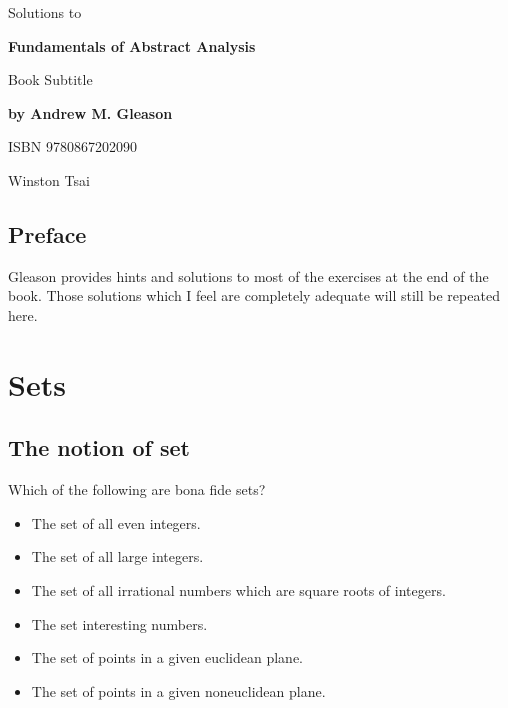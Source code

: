 \documentclass{report}
\begin{document}
\begin{titlepage}
  \begin{center}
    \vspace*{1cm}
    \LARGE
    Solutions to

    \vspace{0.5cm}

    \Huge
    \textbf{Fundamentals of Abstract Analysis}

    \huge
    Book Subtitle

    \LARGE
    \textbf{by Andrew M. Gleason}

    \vspace{0.2cm}

    \large
    ISBN 9780867202090

    \vfill

    \LARGE{Winston Tsai}
  \end{center}
\end{titlepage}
\newpage

\section*{Preface}
Gleason provides hints and solutions to most of the
exercises at the end of the book.
Those solutions which I feel are completely adequate will still be repeated here.


\newpage
\tableofcontents
\newpage

\chapter{Sets}

\section{The notion of set}

\begin{exercise}
Which of the following are bona fide sets?
\begin{itemize}
    \item The set of all even integers.
    \item The set of all large integers.
    \item The set of all irrational numbers which are square roots of integers.
    \item The set interesting numbers.
    \item The set of points in a given euclidean plane.
    \item The set of points in a given noneuclidean plane.
\end{itemize}
\end{exercise}
\end{document}
